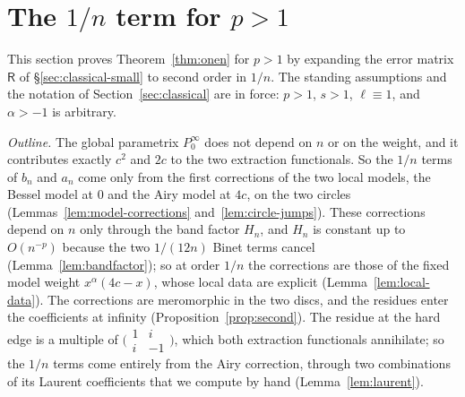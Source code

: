
\section{\texorpdfstring{The $1/n$ term for $p>1$}{The 1/n term for p>1}}\label{sec:second}

This section proves Theorem~\ref{thm:onen} for $p>1$ by expanding the error matrix $\mathsf R$ of \S\ref{sec:classical-small}
to second order in $1/n$. The standing assumptions and the notation of Section~\ref{sec:classical} are in force: $p>1$,
$s>1$, $\ell\equiv1$, and $\alpha>-1$ is arbitrary.

\emph{Outline.} The global parametrix $P^\infty_0$ does not depend on $n$ or on the weight, and it contributes exactly
$c^2$ and $2c$ to the two extraction functionals. So the $1/n$ terms of $b_n$ and $a_n$ come only from the first
corrections of the two local models, the Bessel model at $0$ and the Airy model at $4c$, on the two circles
(Lemmas~\ref{lem:model-corrections} and~\ref{lem:circle-jumps}). These corrections depend on $n$ only through the band
factor $H_n$, and $H_n$ is constant up to $O(n^{-p})$ because the two $1/(12n)$ Binet terms cancel
(Lemma~\ref{lem:bandfactor}); so at order $1/n$ the corrections are those of the fixed model weight $x^\alpha(4c-x)$,
whose local data are explicit (Lemma~\ref{lem:local-data}). The corrections are meromorphic in the two discs, and the
residues enter the coefficients at infinity (Proposition~\ref{prop:second}). The residue at the hard edge is a multiple of
$\bigl(\begin{smallmatrix}1&i\\i&-1\end{smallmatrix}\bigr)$, which both extraction functionals annihilate; so the $1/n$ terms
come entirely from the Airy correction, through two combinations of its Laurent coefficients that we compute by hand
(Lemma~\ref{lem:laurent}).

